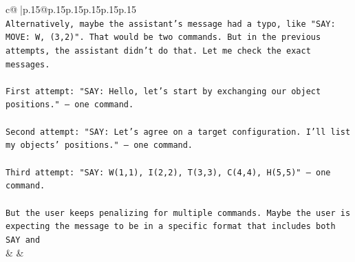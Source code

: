 \documentclass{article}
\begin{document}
{\begin{supertabular}{c@{$\;$}|p{.15\linewidth}@{}p{.15\linewidth}p{.15\linewidth}p{.15\linewidth}p{.15\linewidth}p{.15\linewidth}}
{{{\\ 
\texttt{Alternatively, maybe the assistant's message had a typo, like "SAY: MOVE: W, (3,2)". That would be two commands. But in the previous attempts, the assistant didn't do that. Let me check the exact messages.} \\
\\ 
\texttt{First attempt: "SAY: Hello, let's start by exchanging our object positions." – one command.} \\
\\ 
\texttt{Second attempt: "SAY: Let's agree on a target configuration. I'll list my objects' positions." – one command.} \\
\\ 
\texttt{Third attempt: "SAY: W(1,1), I(2,2), T(3,3), C(4,4), H(5,5)" – one command.} \\
\\ 
\texttt{But the user keeps penalizing for multiple commands. Maybe the user is expecting the message to be in a specific format that includes both SAY and} \\
            }
        }
    }
    & & \\ \\


\end{supertabular}}
\end{document}
